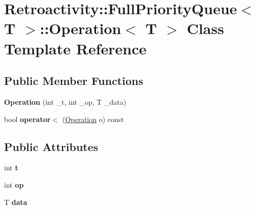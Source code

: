 \hypertarget{classRetroactivity_1_1FullPriorityQueue_1_1Operation}{}\section{Retroactivity\+:\+:Full\+Priority\+Queue$<$ T $>$\+:\+:Operation$<$ T $>$ Class Template Reference}
\label{classRetroactivity_1_1FullPriorityQueue_1_1Operation}
\subsection*{Public Member Functions}
\begin{DoxyCompactItemize}
\item 
\mbox{\label{classRetroactivity_1_1FullPriorityQueue_1_1Operation_a1318b927e997830793eb6416fbff12a5}} 
{\bfseries Operation} (int \+\_\+t, int \+\_\+op, T \+\_\+data)
\item 
\mbox{\label{classRetroactivity_1_1FullPriorityQueue_1_1Operation_aaa46cf483591b87faafa6290075d1170}} 
bool {\bfseries operator$<$} (\hyperlink{classRetroactivity_1_1FullPriorityQueue_1_1Operation}{Operation} o) const
\end{DoxyCompactItemize}
\subsection*{Public Attributes}
\begin{DoxyCompactItemize}
\item 
\mbox{\label{classRetroactivity_1_1FullPriorityQueue_1_1Operation_a1faef667db386d26f41f28c1b288a2da}} 
int {\bfseries t}
\item 
\mbox{\label{classRetroactivity_1_1FullPriorityQueue_1_1Operation_a6ae84df7ac1dbf08e2dcf0975dba7d35}} 
int {\bfseries op}
\item 
\mbox{\label{classRetroactivity_1_1FullPriorityQueue_1_1Operation_aef1fa7a5d4ad8a9dd0feeb0514889c11}} 
T {\bfseries data}
\end{DoxyCompactItemize}


